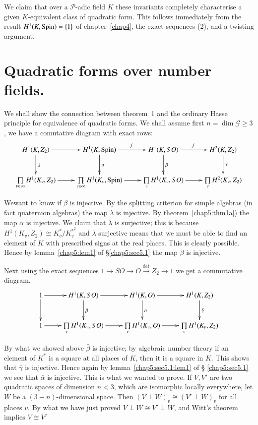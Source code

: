 We claim that over a $\mathscr{P}$-adic field $K$ these invariants
completely characterise a given $K$-equivalent class of quadratic
form. This follows immediately from the result $H^1(K,\operatorname{Spin})= \{ 1 \}$
of chapter~\ref{chap4}, the exact sequences (2), and a twisting argument. 

\section*{Quadratic forms over number fields.}

We shall show the connection between theorem~1 and the ordinary
Hasse principle for equivalence of quadratic forms. We shall
assume first $n = \dim \mathscr{G} \geq 3$, we have a comutative
diagram with exact rows:  
{\fontsize{9}{11}\selectfont
\[
\xymatrix{
H^1(K,Z_2) \ar[r] \ar[d]^\lambda & H^1 (K, \Spin) \ar[r]^f
\ar[d]^\alpha & H^1 (K,SO) \ar[r]^f \ar[d]^\beta & H^2 (K, Z_2)
\ar[d]^\gamma \\
\prod\limits_{v\in\infty} H^1 (K_v, Z_2) \ar[r] &
\prod\limits_{v\in\infty} H^1 (K_v, \Spin) \ar[r] & \prod\limits_v H^1
(K_v, SO) \ar[r] & \prod\limits_v H^2 (K_v, Z_2)
}
\]}

We\pageoriginale want to know if $\beta$ is injective. By the
splitting criterion 
for simple algebras (in fact quaternion algebras) the map $\lambda$ is
injective. By theorem~\ref{chap5:thm1a}) the map $\alpha$ is
injective. We claim 
that $\lambda$ is surjective; this is because $H^1(K_v,Z_2)\cong
K^*_v/K^{*^2}_v$ and $\lambda$ surjective means that we must be able
to find an element of $K$ with prescribed signs at the real
places. This is clearly possible. Hence by lemma~\ref{chap5:lem1} of
\S \ref{chap5:sec5.1} the 
map $\beta$ is injective. 

Next using the exact sequences $1 \to SO \to O \xrightarrow{\det}  Z_2
\to 1$ we get a commutative diagram. 
\[
\xymatrix{
1 \ar[r] \ar[d] & H^1 (K,SO) \ar[r] \ar[d]^{\bar{\beta}} & H^1 (K,O)
\ar[r] \ar[d]^{\bar{\alpha}} & H^1 (K,Z_2) \ar[d]^{\bar{\gamma}}\\
1 \ar[r] & \prod\limits_v H^1 (K_v, SO) \ar[r] & \prod\limits_v H^1
(K_v, O) \ar[r] & \prod\limits_v H^1 (K_v, Z_2)
}
\]
 
 By what we showed above $\bar{\beta}$ is injective; by algebraic
 number theory if an element of $K^*$ is a square at all places of
 $K$, then it is a square in $K$. This shows that $\bar{\gamma}$ is
 injective. Hence again by lemma~\ref{chap5:sec5.1:lem1} of \S
 \ref{chap5:sec5.1} we see that 
 $\bar{\alpha}$ is injective. This is what we wanted to prove. If
 $V,V'$ are two quadratic spaces of dimension $n<3$, which are
 isomorphic locally everywhere, let $W$ be a $(3-n)$-dimensional
 space. Then $(V \perp W)_v \cong (V' \perp W)_v$ for all places
 $v$. By what we have just proved $V \perp W \cong V' \perp W$, and
 Witt's theorem implies $V \cong V'$ 
 

